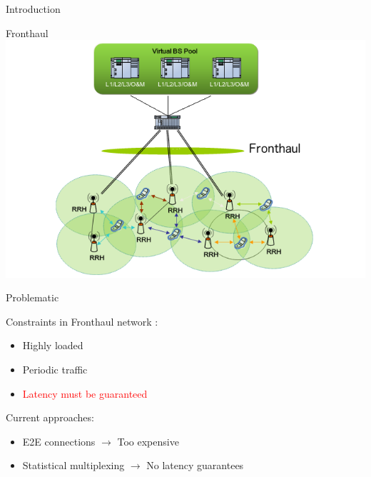\documentclass[10 pt]{beamer}
\begin{document}
\begin{section}{Introduction}
\begin{frame}{Fronthaul}
  \centering
  \includegraphics[scale=0.5]{CRAN}\\
  
\end{frame}

\begin{frame}{Problematic}
  \centering
  
  
 \begin{multicols}{2}
Constraints in Fronthaul network :
\vspace{1cm}
\begin{itemize}
\item Highly loaded
\item Periodic traffic
\item \textcolor{red}{Latency must be guaranteed}
\end{itemize}
\vspace{0.5cm}
Current approaches: \begin{itemize}
\vspace{1cm}
\item E2E connections $\rightarrow$ Too expensive
\item Statistical multiplexing $\rightarrow$ No latency guarantees  
\end{itemize}
\end{multicols}

\end{frame}

\end{section}
\end{document}
